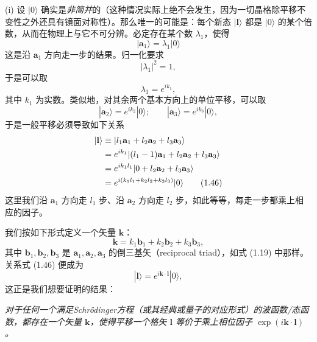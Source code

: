 (i) 设 $|0\rangle$ 确实是\emph{非简并}的（这种情况实际上绝不会发生，因为一切晶格除平移不变性之外还具有镜面对称性）。那么唯一的可能是：每个新态 $|\mathbf{l}\rangle$ 都是 $|0\rangle$ 的某个倍数，从而在物理上与它不可分辨。必定存在某个数 $\lambda_1$，使得
\begin{equation*}
|\mathbf{a}_1\rangle=\lambda_1|0\rangle
\tag{1.42}
\end{equation*}
这是沿 $\mathbf{a}_1$ 方向走一步的结果。归一化要求
\begin{equation*}
|\lambda_1|^{2}=1,
\tag{1.43}
\end{equation*}
于是可以取
\begin{equation*}
\lambda_1=e^{ik_1},
\tag{1.44}
\end{equation*}
其中 $k_1$ 为实数。类似地，对其余两个基本方向上的单位平移，可以取
\begin{equation*}
|\mathbf{a}_2\rangle=e^{ik_2}|0\rangle;\qquad|\mathbf{a}_3\rangle=e^{ik_3}|0\rangle,
\tag{1.45}
\end{equation*}
于是一般平移必须导致如下关系
\begin{align*}
|\mathbf{l}\rangle&\equiv|l_1\mathbf{a}_1+l_2\mathbf{a}_2+l_3\mathbf{a}_3\rangle\notag\\
&=e^{ik_1}|(l_1-1)\mathbf{a}_1+l_2\mathbf{a}_2+l_3\mathbf{a}_3\rangle\notag\\
&=e^{ik_1 l_1}|0+l_2\mathbf{a}_2+l_3\mathbf{a}_3\rangle\notag\\
&=e^{i(k_1 l_1+k_2 l_2+k_3 l_3)}|0\rangle
\tag{1.46}
\end{align*}
这里我们沿 $\mathbf{a}_1$ 方向走 $l_1$ 步、沿 $\mathbf{a}_2$ 方向走 $l_2$ 步，如此等等，每走一步都乘上相应的因子。

我们按如下形式定义一个矢量 $\mathbf{k}$：
\begin{equation*}
\mathbf{k}=k_1\mathbf{b}_1+k_2\mathbf{b}_2+k_3\mathbf{b}_3,
\tag{1.47}
\end{equation*}
其中 $\mathbf{b}_1,\mathbf{b}_2,\mathbf{b}_3$ 是 $\mathbf{a}_1,\mathbf{a}_2,\mathbf{a}_3$ 的倒三基矢（reciprocal triad），如式 (1.19) 中那样。关系式 (1.46) 便成为
\begin{equation*}
|\mathbf{l}\rangle=e^{i\mathbf{k}\cdot\mathbf{l}}|0\rangle,
\tag{1.48}
\end{equation*}
这正是我们想要证明的结果：

\emph{对于任何一个满足Schrödinger方程（或其经典或量子的对应形式）的波函数/态函数，都存在一个矢量 $\mathbf{k}$，使得平移一个格矢 $\mathbf{l}$ 等价于乘上相位因子 $\exp(i\mathbf{k}\cdot\mathbf{l})$。}

